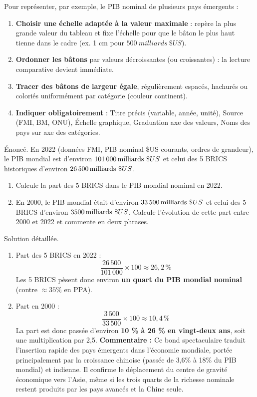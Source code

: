 \documentclass[11pt]{article}
\begin{document}
\begin{methode}
Pour représenter, par exemple, le PIB nominal de plusieurs pays émergents :
\begin{enumerate}
\item \textbf{Choisir une échelle adaptée à la valeur maximale} : repère la plus grande valeur du tableau et fixe l'échelle pour que le bâton le plus haut tienne dans le cadre (ex. 1 cm pour $\SI{500}{milliards}\ \$US$).
\item \textbf{Ordonner les bâtons} par valeurs décroissantes (ou croissantes) : la lecture comparative devient immédiate.
\item \textbf{Tracer des bâtons de largeur égale}, régulièrement espacés, hachurés ou coloriés uniformément par catégorie (couleur continent).
\item \textbf{Indiquer obligatoirement} : Titre précis (variable, année, unité), Source (FMI, BM, ONU), Échelle graphique, Graduation axe des valeurs, Noms des pays sur axe des catégories.
\end{enumerate}
\end{methode}

\begin{exoresolu}
Énoncé. En 2022 (données FMI, PIB nominal \$US courants, ordres de grandeur), le PIB mondial est d'environ $\SI{101\,000}{milliards}\ \$US$ et celui des 5 BRICS historiques d'environ $\SI{26\,500}{milliards}\ \$US$.
\begin{enumerate}
\item Calcule la part des 5 BRICS dans le PIB mondial nominal en 2022.
\item En 2000, le PIB mondial était d'environ $\SI{33\,500}{milliards}\ \$US$ et celui des 5 BRICS d'environ $\SI{3\,500}{milliards}\ \$US$. Calcule l'évolution de cette part entre 2000 et 2022 et commente en deux phrases.
\end{enumerate}
\tcblower
Solution détaillée.
\begin{enumerate}
\item Part des 5 BRICS en 2022 :
\[ \frac{26\,500}{101\,000}\times 100 \approx 26,2\,\% \]
Les 5 BRICS pèsent donc environ \textbf{un quart du PIB mondial nominal} (contre $\approx 35\%$ en PPA).
\item Part en 2000 :
\[ \frac{3\,500}{33\,500}\times 100 \approx 10,4\,\% \]
La part est donc passée d'environ \textbf{10 \% à 26 \% en vingt-deux ans}, soit une multiplication par 2,5.
\textbf{Commentaire :} Ce bond spectaculaire traduit l'insertion rapide des pays émergents dans l'économie mondiale, portée principalement par la croissance chinoise (passée de 3,6\% à 18\% du PIB mondial) et indienne. Il confirme le déplacement du centre de gravité économique vers l'Asie, même si les trois quarts de la richesse nominale restent produits par les pays avancés et la Chine seule.
\end{enumerate}
\end{exoresolu}
\end{document}
